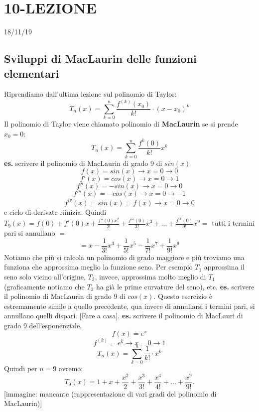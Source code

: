\section*{10-LEZIONE}
18/11/19
\subsection*{Sviluppi di MacLaurin delle funzioni elementari}
Riprendiamo dall'ultima lezione sul polinomio di Taylor:
\[
    T_n(x) = \sum_{k=0}^{n}\frac{f^{(k)}(x_0)}{k!} \cdot  (x-x_0)^k
\]
Il polinomio di Taylor viene chiamato polinomio di \textbf{MacLaurin} se si prende $x_0 = 0$:
\[
    T_n(x) = \sum_{k=0}^{n} \frac{f^{k}(0)}{k!} x^k
\]
\newline
\newline
\textbf{es.} scrivere il polinomio di MacLaurin di grado 9 di $sin(x)$
\[
    f(x) = sin(x) \rightarrow x=0 \rightarrow 0
\]
\[
    f'(x) = cos(x) \rightarrow x=0 \rightarrow 1
\]
\[
    f''(x)= -sin(x) \rightarrow x=0 \rightarrow 0
\]
\[
    f'''(x)= -cos(x) \rightarrow x=0 \rightarrow-1
\]
\[
    f^{iv}(x) = sin(x) = f(x) \rightarrow x=0 \rightarrow 0
\]
e ciclo di derivate riinizia. Quindi $T_9(x) = f(0) +f'(0) x + \frac{f''(0)x^2}{2!} + \frac{f'''(0)}{3!}x^3 + \dots + \frac{f^{ix}(0)}{9!}x^9 =$ tutti i termini pari si annullano  $=$
\[
    = x - \frac{1}{3!}x^3 + \frac{1}{5!}x^5 - \frac{1}{7!}x^7 + \frac{1}{9!}x^9
\]
Notiamo che più si calcola un polinomio di grado maggiore e più troviamo una funziona che approssima meglio la funzione seno. Per esempio $T_1$ approssima il seno solo vicino all'origine, $T_3$, invece, approssima molto meglio di $T_1$ (graficamente notiamo che $T_3$ ha già le prime curvature del seno), etc.
\newline
\newline
\textbf{es.} scrivere il polinomio di MacLaurin di grado 9 di $cos(x)$.\newline
Questo esercizio è estremamente simile a quello precedente, qua invece di annullarsi i termini pari, si annullano quelli dispari. [Fare a casa].
\newline
\newline
\textbf{es.} scrivere il polinomio di MacLauri di grado 9 dell'esponenziale.\newline
\[
    f(x) = e^x
\]
\[
    f^{(k)} = e^k \rightarrow x=0 \rightarrow 1
\]
\[
    T_n(x) = \sum_{k=0}^{n} \frac{1}{k!} \cdot x^k
\]
Quindi per $n=9$ avremo:
\[
    T_9(x) = 1+x+\frac{x^2}{2} + \frac{x^3}{3!} + \frac{x^4}{4!} + \dots + \frac{x^9}{9!}.
\]
[immagine: mancante (rappresentazione di vari gradi del polinomio di MacLaurin)]\newline
\newline
\newline
